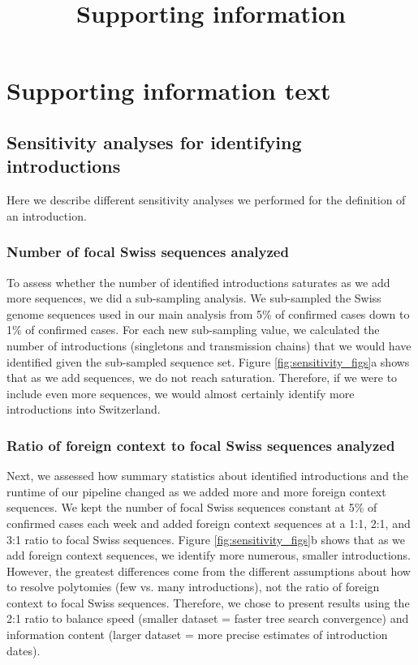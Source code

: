 \documentclass[9pt,twoside,lineno]{pnas-new}
\title{Supporting information}
\author{}
\begin{document}
\maketitle 

\tableofcontents

\newpage

\section{Supporting information text}

\subsection{Sensitivity analyses for identifying introductions}
Here we describe different sensitivity analyses we performed for the definition of an introduction. 

\subsubsection{Number of focal Swiss sequences analyzed}
To assess whether the number of identified introductions saturates as we add more sequences, we did a sub-sampling analysis. We sub-sampled the Swiss genome sequences used in our main analysis from 5\% of confirmed cases down to 1\% of confirmed cases. For each new sub-sampling value, we calculated the number of introductions (singletons and transmission chains) that we would have identified given the sub-sampled sequence set. Figure \ref{fig:sensitivity_figs}a shows that as we add sequences, we do not reach saturation. Therefore, if we were to include even more sequences, we would almost certainly identify more introductions into Switzerland.

\subsubsection{Ratio of foreign context to focal Swiss sequences analyzed}
Next, we assessed how summary statistics about identified introductions and the runtime of our pipeline changed as we added more and more foreign context sequences. We kept the number of focal Swiss sequences constant at 5\% of confirmed cases each week and added foreign context sequences at a 1:1, 2:1, and 3:1 ratio to focal Swiss sequences. Figure \ref{fig:sensitivity_figs}b shows that as we add foreign context sequences, we identify more numerous, smaller introductions. However, the greatest differences come from the different assumptions about how to resolve polytomies (few vs. many introductions), not the ratio of foreign context to focal Swiss sequences. Therefore, we chose to present results using the 2:1 ratio to balance speed (smaller dataset = faster tree search convergence) and information content (larger dataset = more precise estimates of introduction dates).
\end{document}
